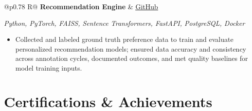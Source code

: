 \documentclass[a4paper,10pt]{article}
\newcommand{\ulink}[2]{\href{#1}{\uline{#2}}}
\newcommand{\subheading}[1]{{\color[HTML]{0A0A0A}\fontsize{12}{14}\selectfont\bfseries #1}}
\newcommand{\techstack}[1]{{\color[HTML]{5C5C5C}\fontsize{10.5}{12.5}\selectfont\itshape #1}}
\newcommand{\meta}[1]{{\color[HTML]{5C5C5C}\fontsize{10.5}{12.5}\selectfont #1}}
\begin{document}
\vspace{2pt}

\begin{tabularx}{\linewidth}{@{}p{0.78\linewidth} R@{}}
\subheading{Recommendation Engine} & \meta{\ulink{https://github.com/su-jin1425/Recommendation-Engine}{GitHub}}
\end{tabularx}
\vspace{1pt}
\techstack{Python, PyTorch, FAISS, Sentence Transformers, FastAPI, PostgreSQL, Docker}
\begin{itemize}[nosep, leftmargin=1.5em, itemsep=1pt, topsep=2pt]
\item {\color[HTML]{0A0A0A}\fontsize{11}{14}\selectfont
Collected and labeled ground truth preference data to train and evaluate personalized recommendation models; ensured data accuracy and consistency across annotation cycles, documented outcomes, and met quality baselines for model training inputs.}
\end{itemize}

\vspace{2pt}

\section{Certifications \& Achievements}
\vspace{2pt}
\end{document}
